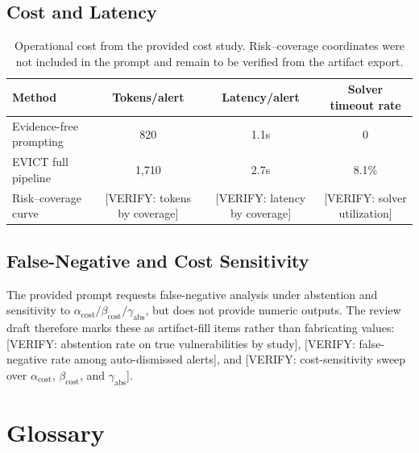 \subsection{Cost and Latency}

\begin{table}[h]
\centering
\caption{Operational cost from the provided cost study. Risk--coverage coordinates were not included in the prompt and remain to be verified from the artifact export.}
\label{tab:cost_appendix}
\small
\begin{tabular}{lccc}
\toprule
\textbf{Method} & \textbf{Tokens/alert} & \textbf{Latency/alert} & \textbf{Solver timeout rate} \\
\midrule
Evidence-free prompting & 820 & 1.1s & 0 \\
EVICT full pipeline & 1,710 & 2.7s & 8.1\% \\
Risk--coverage curve & [VERIFY: tokens by coverage] & [VERIFY: latency by coverage] & [VERIFY: solver utilization] \\
\bottomrule
\end{tabular}
\end{table}

\subsection{False-Negative and Cost Sensitivity}

The provided prompt requests false-negative analysis under abstention and sensitivity to $\alpha_{\mathrm{cost}}/\beta_{\mathrm{cost}}/\gamma_{\mathrm{abs}}$, but does not provide numeric outputs. The review draft therefore marks these as artifact-fill items rather than fabricating values: [VERIFY: abstention rate on true vulnerabilities by study], [VERIFY: false-negative rate among auto-dismissed alerts], and [VERIFY: cost-sensitivity sweep over $\alpha_{\mathrm{cost}}$, $\beta_{\mathrm{cost}}$, and $\gamma_{\mathrm{abs}}$].

\section{Glossary}
\label{app:glossary}

